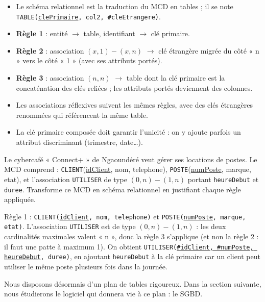 \documentclass[11pt]{article}
\newcommand{\cle}[1]{{\popxbold\color{popdark}#1}}
\begin{document}
\begin{aretenir}
\begin{itemize}
  \item Le \cle{schéma relationnel} est la traduction du MCD en tables ; il se note \texttt{TABLE(\underline{clePrimaire}, col2, \#cleEtrangere)}.
  \item \textbf{Règle 1} : entité $\rightarrow$ table, identifiant $\rightarrow$ clé primaire.
  \item \textbf{Règle 2} : association $(x,1)-(x,n)$ $\rightarrow$ clé étrangère migrée du côté « n » vers le côté « 1 » (avec ses attributs portés).
  \item \textbf{Règle 3} : association $(n,n)$ $\rightarrow$ table dont la clé primaire est la concaténation des clés reliées ; les attributs portés deviennent des colonnes.
  \item Les associations réflexives suivent les mêmes règles, avec des clés étrangères renommées qui référencent la même table.
  \item La clé primaire composée doit garantir l'unicité : on y ajoute parfois un attribut discriminant (trimestre, date\dots).
\end{itemize}
\end{aretenir}

\begin{exercice}
Le cybercafé « Connect+ » de Ngaoundéré veut gérer ses locations de postes. Le MCD comprend : \texttt{CLIENT}(\underline{idClient}, nom, telephone), \texttt{POSTE}(\underline{numPoste}, marque, etat), et l'association \texttt{UTILISER} de type $(0,n)-(1,n)$ portant \texttt{heureDebut} et \texttt{duree}. Transforme ce MCD en schéma relationnel en justifiant chaque règle appliquée.
\end{exercice}

\begin{corrige}[Exercice 1]
Règle 1 : \texttt{CLIENT(\underline{idClient}, nom, telephone)} et \texttt{POSTE(\underline{numPoste}, marque, etat)}. L'association \texttt{UTILISER} est de type $(0,n)-(1,n)$ : les deux cardinalités maximales valent « n », donc la règle 3 s'applique (et non la règle 2 : il faut une patte à maximum 1). On obtient \texttt{UTILISER(\underline{\#idClient, \#numPoste, heureDebut}, duree)}, en ajoutant \texttt{heureDebut} à la clé primaire car un client peut utiliser le même poste plusieurs fois dans la journée.
\end{corrige}

Nous disposons désormais d'un plan de tables rigoureux. Dans la section suivante, nous étudierons le logiciel qui donnera vie à ce plan : le \cle{SGBD}.
\end{document}

